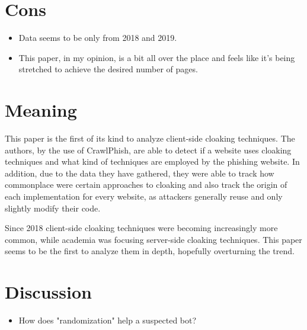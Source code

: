 \documentclass{article}
\begin{document}
\section{Cons}

\begin{itemize}
	\item Data seems to be only from 2018 and 2019.
	\item This paper, in my opinion, is a bit all over the place and feels like it's being stretched to achieve the desired number of pages.
\end{itemize}

\section{Meaning}

This paper is the first of its kind to analyze client-side cloaking techniques. The authors, by the use of CrawlPhish, are able to detect if a website uses cloaking techniques and what kind of techniques are employed by the phishing website. In addition, due to the data they have gathered, they were able to track how commonplace were certain approaches to cloaking and also track the origin of each implementation for every website, as attackers generally reuse and only slightly modify their code.

Since 2018 client-side cloaking techniques were becoming increasingly more common, while academia was focusing server-side cloaking techniques. This paper seems to be the first to analyze them in depth, hopefully overturning the trend.


\section{Discussion}

\begin{itemize}
	\item How does "randomization" help a suspected bot? 
\end{itemize}
\end{document}
